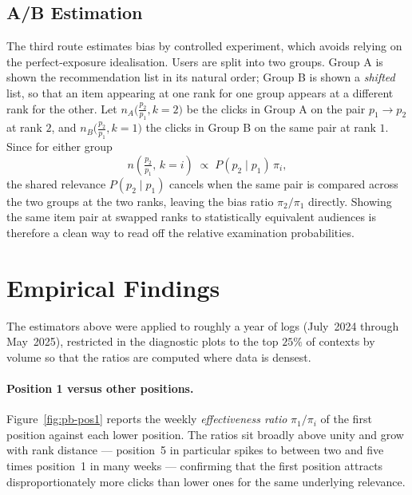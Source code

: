 \subsection{A/B Estimation}
\label{sec:pb-ab}
The third route estimates bias by controlled experiment, which avoids relying
on the perfect-exposure idealisation. Users are split into two groups. Group A
is shown the recommendation list in its natural order; Group B is shown a
\emph{shifted} list, so that an item appearing at one rank for one group
appears at a different rank for the other. Let $n_A\!\big(\tfrac{p_2}{p_1},
k{=}2\big)$ be the clicks in Group A on the pair $p_1\!\to\!p_2$ at rank $2$,
and $n_B\!\big(\tfrac{p_2}{p_1}, k{=}1\big)$ the clicks in Group B on the same
pair at rank $1$. Since for either group
\begin{equation}
  \label{eq:ab}
  n\!\left(\tfrac{p_2}{p_1},\, k{=}i\right) \;\propto\; P(p_2\mid p_1)\,\pi_i,
\end{equation}
the shared relevance $P(p_2\mid p_1)$ cancels when the same pair is compared
across the two groups at the two ranks, leaving the bias ratio
$\pi_2/\pi_1$ directly. Showing the same item pair at swapped ranks to
statistically equivalent audiences is therefore a clean way to read off the
relative examination probabilities.

\section{Empirical Findings}
\label{sec:pb-findings}

The estimators above were applied to roughly a year of logs (July~2024 through
May~2025), restricted in the diagnostic plots to the top $25\%$ of contexts by
volume so that the ratios are computed where data is densest.

\paragraph{Position 1 versus other positions.}
Figure~\ref{fig:pb-pos1} reports the weekly \emph{effectiveness ratio}
$\pi_1/\pi_i$ of the first position against each lower position. The ratios sit
broadly above unity and grow with rank distance --- position~5 in particular
spikes to between two and five times position~1 in many weeks --- confirming
that the first position attracts disproportionately more clicks than lower
ones for the same underlying relevance.


